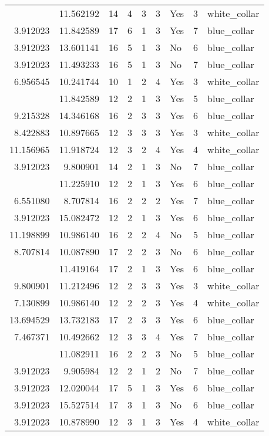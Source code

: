 \documentclass[
]{article}
\begin{document}
\begin{longtable}[t]{rrrrrllrl}
\addlinespace
8.993427 & 11.562192 & 14 & 4 & 3 & 3 & Yes & 3 & white\_collar\\
3.912023 & 11.842589 & 17 & 6 & 1 & 3 & Yes & 7 & blue\_collar\\
3.912023 & 13.601141 & 16 & 5 & 1 & 3 & No & 6 & blue\_collar\\
3.912023 & 11.493233 & 16 & 5 & 1 & 3 & No & 7 & blue\_collar\\
6.956545 & 10.241744 & 10 & 1 & 2 & 4 & Yes & 3 & white\_collar\\
\addlinespace
3.912023 & 11.842589 & 12 & 2 & 1 & 3 & Yes & 5 & blue\_collar\\
9.215328 & 14.346168 & 16 & 2 & 3 & 3 & Yes & 6 & blue\_collar\\
8.422883 & 10.897665 & 12 & 3 & 3 & 3 & Yes & 3 & white\_collar\\
11.156965 & 11.918724 & 12 & 3 & 2 & 4 & Yes & 4 & white\_collar\\
3.912023 & 9.800901 & 14 & 2 & 1 & 3 & No & 7 & blue\_collar\\
\addlinespace
3.912023 & 11.225910 & 12 & 2 & 1 & 3 & Yes & 6 & blue\_collar\\
6.551080 & 8.707814 & 16 & 2 & 2 & 2 & Yes & 7 & blue\_collar\\
3.912023 & 15.082472 & 12 & 2 & 1 & 3 & Yes & 6 & blue\_collar\\
11.198899 & 10.986140 & 16 & 2 & 2 & 4 & No & 5 & blue\_collar\\
8.707814 & 10.087890 & 17 & 2 & 2 & 3 & No & 6 & blue\_collar\\
\addlinespace
3.912023 & 11.419164 & 17 & 2 & 1 & 3 & Yes & 6 & blue\_collar\\
9.800901 & 11.212496 & 12 & 2 & 3 & 3 & Yes & 3 & white\_collar\\
7.130899 & 10.986140 & 12 & 2 & 2 & 3 & Yes & 4 & white\_collar\\
13.694529 & 13.732183 & 17 & 2 & 3 & 3 & Yes & 6 & blue\_collar\\
7.467371 & 10.492662 & 12 & 3 & 3 & 4 & Yes & 7 & blue\_collar\\
\addlinespace
6.309918 & 11.082911 & 16 & 2 & 2 & 3 & No & 5 & blue\_collar\\
3.912023 & 9.905984 & 12 & 2 & 1 & 2 & No & 7 & blue\_collar\\
3.912023 & 12.020044 & 17 & 5 & 1 & 3 & Yes & 6 & blue\_collar\\
3.912023 & 15.527514 & 17 & 3 & 1 & 3 & No & 6 & blue\_collar\\
3.912023 & 10.878990 & 12 & 3 & 1 & 3 & Yes & 4 & white\_collar\\

\end{longtable}
\end{document}

